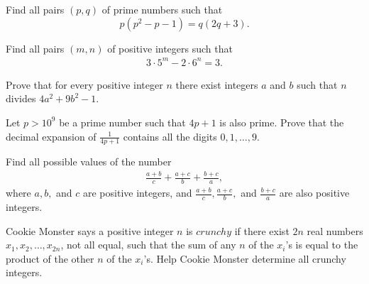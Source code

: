 \documentclass[problems.tex]{subfile}
\begin{document}
	\begin{problem}
		Find all pairs $(p,q)$ of prime numbers such that
		$$ p(p^2 - p - 1) = q(2q + 3) .$$
	\end{problem}




	\begin{problem}
		Find all pairs $(m, n)$ of positive integers such that
		\begin{align*}
			3 \cdot 5^m - 2\cdot 6^n = 3.
		\end{align*}
	\end{problem}




	\begin{problem}
		Prove that for every positive integer $n$ there exist integers $a$ and $b$ such that $n$ divides $4a^2 + 9b^2 - 1$.
	\end{problem}



	\begin{problem}
		Let $p > 10^9$ be a prime number such that $4p + 1$ is also prime.
		Prove that the decimal expansion of $\frac{1}{4p+1}$ contains all the digits $0,1, \ldots, 9$. %
	\end{problem}




	\begin{problem}
		Find all possible values of the number
		\begin{align*}
			\frac{a+b}{c}+ \frac{a+c}{b}+ \frac{b+c}{a},
		\end{align*}
		where $a, b,$ and $c$ are positive integers, and $\displaystyle\frac{a+b}{c}, \frac{a+c}{b},$ and $\displaystyle\frac{b+c}{a}$ are also positive integers.
	\end{problem}





	\begin{problem}[ELMO 2016]
		Cookie Monster says a positive integer $n$ is $crunchy$ if there exist $2n$ real numbers $x_1,x_2,\ldots,x_{2n}$, not all equal, such that the sum of any $n$ of the $x_i$'s is equal to the product of the other $n$ of the $x_i$'s. Help Cookie Monster determine all crunchy integers. %
	\end{problem}
\end{document}
